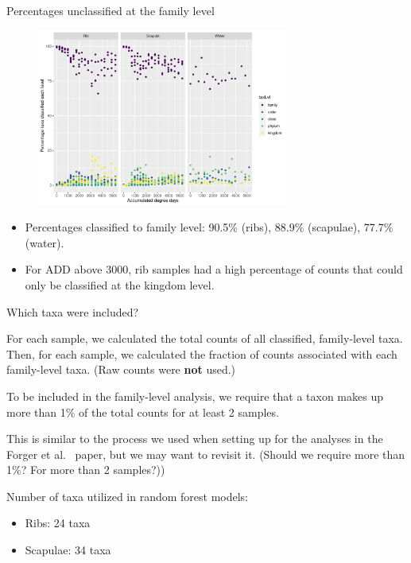 \documentclass{beamer}
\begin{document}
\begin{frame}{Percentages unclassified at the family level}

  \begin{center}
    \begin{figure}
      \includegraphics[width=3.25in]{family_perc_classif_by_add_type}
    \end{figure}
  \end{center}
  \vspace{-0.1in}
  {\footnotesize
  \begin{itemize}
    \item Percentages classified to family level: 90.5\% (ribs), 88.9\%
    (scapulae), 77.7\% (water).
    \item For ADD above 3000, rib samples had a high percentage of
  counts that could only be classified at the kingdom level.
  \end{itemize}
  }
\end{frame}



\begin{frame}{Which taxa were included?}

  \noindent For each sample, we calculated the total counts of all classified,
family-level taxa.  Then, for each sample, we calculated the fraction of counts
associated with each family-level taxa.  (Raw counts were \textbf{not} used.)

  \vspace{0.1in}

  \noindent To be included in the family-level analysis, we require that a taxon
  makes up more than 1\% of the total counts for at least 2 samples.

  \vspace{0.1in}

  \noindent This is similar to the process we used when setting up for the
analyses in the Forger et al.~ paper, but we may want to revisit it.  (Should we
require more than 1\%?  For more than 2 samples?))

  \vspace{0.1in}

  \noindent Number of taxa utilized in random forest models:
  \begin{itemize}
    \item Ribs: 24 taxa
    \item Scapulae: 34 taxa
  \end{itemize}


\end{frame}
\end{document}
